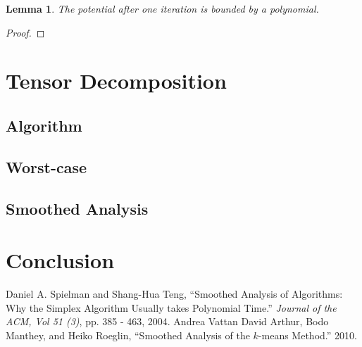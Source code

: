 \documentclass[11pt]{article}
\newtheorem{lemma}{Lemma}
\theoremstyle{definition}
\begin{document}
\begin{lemma}
The potential after one iteration is bounded by a polynomial.
\end{lemma}
\begin{proof}
\end{proof}

\section{Tensor Decomposition}
\subsection{Algorithm}
\subsection{Worst-case}
\subsection{Smoothed Analysis}

\section{Conclusion}

\begin{thebibliography}{1}
    Daniel A. Spielman and Shang{-}Hua Teng,
    ``Smoothed Analysis of Algorithms: Why the Simplex Algorithm Usually takes Polynomial Time.''
    \emph{Journal of the ACM, Vol 51 (3)},
    pp. 385 - 463,
    2004.
    Andrea Vattan 
    David Arthur, Bodo Manthey, and Heiko Roeglin,
    ``Smoothed Analysis of the $k$-means Method.''
    2010.
\end{thebibliography}
\end{document}
